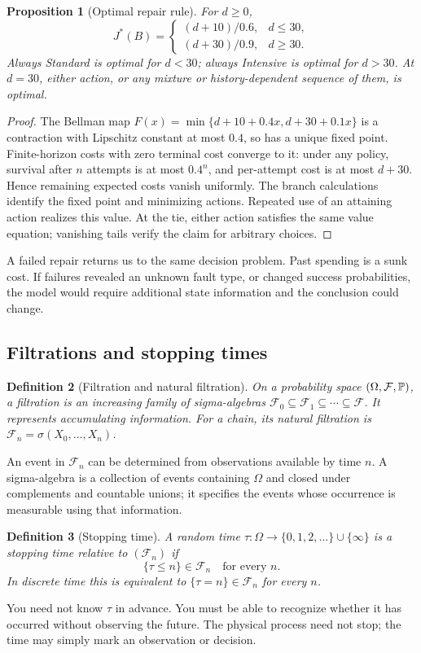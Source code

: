 \documentclass[11pt]{article}
\newtheorem{definition}{Definition}[section]
\newtheorem{proposition}[definition]{Proposition}
\theoremstyle{remark}\newtheorem{remark}[definition]{Remark}
\begin{document}
\begin{proposition}[Optimal repair rule]
For $d\geq0$,
\[
J^*(B)=\begin{cases}(d+10)/0.6,&d\leq30,\\(d+30)/0.9,&d\geq30.\end{cases}
\]
Always Standard is optimal for $d<30$; always Intensive is optimal for $d>30$. At $d=30$, either action, or any mixture or history-dependent sequence of them, is optimal.
\end{proposition}
\begin{proof}
The Bellman map $F(x)=\min\{d+10+0.4x,d+30+0.1x\}$ is a contraction with Lipschitz constant at most $0.4$, so has a unique fixed point. Finite-horizon costs with zero terminal cost converge to it: under any policy, survival after $n$ attempts is at most $0.4^n$, and per-attempt cost is at most $d+30$. Hence remaining expected costs vanish uniformly. The branch calculations identify the fixed point and minimizing actions. Repeated use of an attaining action realizes this value. At the tie, either action satisfies the same value equation; vanishing tails verify the claim for arbitrary choices.
\end{proof}
A failed repair returns us to the same decision problem. Past spending is a sunk cost. If failures revealed an unknown fault type, or changed success probabilities, the model would require additional state information and the conclusion could change.

\clearpage
\subsection{Filtrations and stopping times}
\begin{definition}[Filtration and natural filtration]
On a probability space $(\Omega,\mathcal F,\mathbb P)$, a filtration is an increasing family of sigma-algebras $\mathcal F_0\subseteq\mathcal F_1\subseteq\cdots\subseteq\mathcal F$. It represents accumulating information. For a chain, its natural filtration is $\mathcal F_n=\sigma(X_0,\ldots,X_n)$.
\end{definition}
An event in $\mathcal F_n$ can be determined from observations available by time $n$. A sigma-algebra is a collection of events containing $\Omega$ and closed under complements and countable unions; it specifies the events whose occurrence is measurable using that information.

\begin{definition}[Stopping time]
A random time $\tau:\Omega\to\{0,1,2,\ldots\}\cup\{\infty\}$ is a stopping time relative to $(\mathcal F_n)$ if
\[
\{\tau\leq n\}\in\mathcal F_n\quad\text{for every }n.
\]
In discrete time this is equivalent to $\{\tau=n\}\in\mathcal F_n$ for every $n$.
\end{definition}
You need not know $\tau$ in advance. You must be able to recognize whether it has occurred without observing the future. The physical process need not stop; the time may simply mark an observation or decision.
\end{document}
